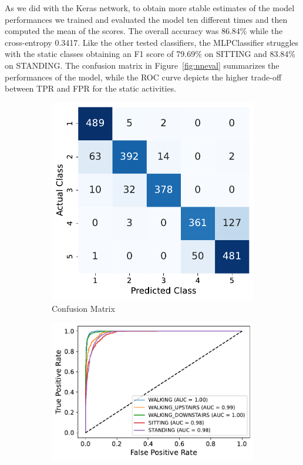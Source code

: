 \documentclass[10pt, a4paper, twocolumn]{article}
\begin{document}
As we did with the Keras network, to obtain more stable estimates of the model performances we trained and evaluated the model ten different times and then computed the mean of the scores. The overall accuracy was 86.84\% while the cross-entropy 0.3417. Like the other tested classifiers, the MLPClassifier struggles with the static classes obtaining an F1 score of 79.69\% on SITTING and 83.84\% on STANDING. The confusion matrix in Figure~\ref{fig:nneval} summarizes the performances of the model, while the ROC curve depicts the higher trade-off between TPR and FPR for the static activities.

\begin{figure}[h]
    \centering
    \begin{subfigure}[t]{0.40\columnwidth}
    \includegraphics[width=\linewidth]{immagini simone/conf_mtx_sklearn_ann.pdf}
    \caption{Confusion Matrix}
    \label{fig:nnconf}
\end{subfigure}
\hfill%
\begin{subfigure}[t]{0.55\columnwidth}
    \centering
    \includegraphics[width=\linewidth]{immagini simone/roc_sklearn_ann.pdf}

\end{subfigure}
\end{figure}
\end{document}
